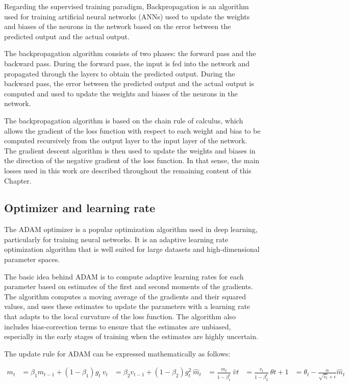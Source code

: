 Regarding the supervised training paradigm, Backpropagation is an algorithm used for training artificial neural networks (ANNs) used to update the weights and biases of the neurons in the network based on the error between the predicted output and the actual output.

The backpropagation algorithm consists of two phases: the forward pass and the backward pass. During the forward pass, the input is fed into the network and propagated through the layers to obtain the predicted output. During the backward pass, the error between the predicted output and the actual output is computed and used to update the weights and biases of the neurons in the network.

The backpropagation algorithm is based on the chain rule of calculus, which allows the gradient of the loss function with respect to each weight and bias to be computed recursively from the output layer to the input layer of the network. The gradient descent algorithm is then used to update the weights and biases in the direction of the negative gradient of the loss function. In that sense, the main losses used in this work are described throughout the remaining content of this Chapter.

\subsection{Optimizer and learning rate}
\label{subsec:3_optimizer_and_lr}

The ADAM optimizer is a popular optimization algorithm used in deep learning, particularly for training neural networks. It is an adaptive learning rate optimization algorithm that is well suited for large datasets and high-dimensional parameter spaces.

The basic idea behind ADAM is to compute adaptive learning rates for each parameter based on estimates of the first and second moments of the gradients. The algorithm computes a moving average of the gradients and their squared values, and uses these estimates to update the parameters with a learning rate that adapts to the local curvature of the loss function. The algorithm also includes bias-correction terms to ensure that the estimates are unbiased, especially in the early stages of training when the estimates are highly uncertain.

The update rule for ADAM can be expressed mathematically as follows:

\begin{align*}
	m_t &= \beta_1 m_{t-1} + (1-\beta_1) g_t \
	v_t &= \beta_2 v_{t-1} + (1-\beta_2) g_t^2 \
	\hat{m}_t &= \frac{m_t}{1-\beta_1^t} \
	\hat{v}t &= \frac{v_t}{1-\beta_2^t} \
	\theta{t+1} &= \theta_t - \frac{\alpha}{\sqrt{\hat{v}_t}+\epsilon} \hat{m}_t
\end{align*}

